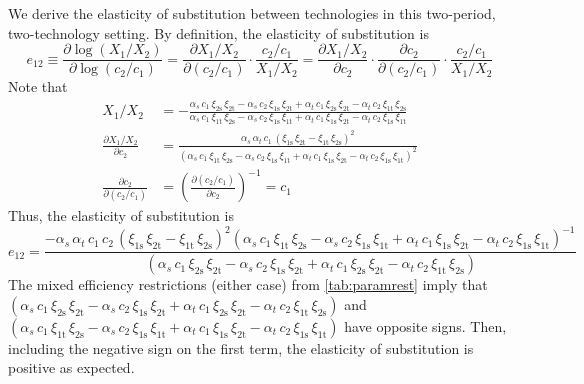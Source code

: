 \documentclass[11pt,a4paper,leqno]{extarticle}
\begin{document}
	We derive the elasticity of substitution between technologies in this two-period, two-technology setting. By definition, the elasticity of substitution is 
	\begin{equation}
	e_{12} \equiv \frac{\partial \log(X_1/X_2)}{\partial \log(c_2/c_1)} = \frac{\partial X_1/X_2 }{ \partial (c_2/c_1)} \cdot \frac{c_2/c_1}{X_1/X_2} = \frac{\partial X_1/X_2}{ \partial  c_2}  \cdot \frac{\partial c_2}{\partial (c_2/c_1)} \cdot \frac{c_2/c_1}{X_1/X_2} 
	\end{equation}
	Note that
	\begin{align}
		X_1/X_2 &= -\frac{\alpha _{s}\,c_{1}\,\xi _{\mathrm{2s}}\,\xi _{\mathrm{2t}}-\alpha _{s}\,c_{2}\,\xi _{\mathrm{1s}}\,\xi _{\mathrm{2t}}+\alpha _{t}\,c_{1}\,\xi _{\mathrm{2s}}\,\xi _{\mathrm{2t}}-\alpha _{t}\,c_{2}\,\xi _{\mathrm{1t}}\,\xi _{\mathrm{2s}}}{\alpha _{s}\,c_{1}\,\xi _{\mathrm{1t}}\,\xi _{\mathrm{2s}}-\alpha _{s}\,c_{2}\,\xi _{\mathrm{1s}}\,\xi _{\mathrm{1t}}+\alpha _{t}\,c_{1}\,\xi _{\mathrm{1s}}\,\xi _{\mathrm{2t}}-\alpha _{t}\,c_{2}\,\xi _{\mathrm{1s}}\,\xi _{\mathrm{1t}}} \\
		\frac{\partial X_1/X_2}{\partial c_2} &= \frac{\alpha _{s}\,\alpha _{t}\,c_{1}\,{\left(\xi _{\mathrm{1s}}\,\xi _{\mathrm{2t}}-\xi _{\mathrm{1t}}\,\xi _{\mathrm{2s}}\right)}^2}{{\left(\alpha _{s}\,c_{1}\,\xi _{\mathrm{1t}}\,\xi _{\mathrm{2s}}-\alpha _{s}\,c_{2}\,\xi _{\mathrm{1s}}\,\xi _{\mathrm{1t}}+\alpha _{t}\,c_{1}\,\xi _{\mathrm{1s}}\,\xi _{\mathrm{2t}}-\alpha _{t}\,c_{2}\,\xi _{\mathrm{1s}}\,\xi _{\mathrm{1t}}\right)}^2}	 \\
		\frac{\partial c_2}{\partial (c_2/c_1)} &= \left( \frac{\partial (c_2/c_1)}{\partial c_2} \right)^{-1} = c_1
	\end{align}
	Thus, the elasticity of substitution is
	\begin{equation}
	e_{12} = 
	\frac{-\alpha _{s}\,\alpha _{t}\,c_{1}\,c_{2}\,{\left(\xi _{\mathrm{1s}}\,\xi _{\mathrm{2t}}-\xi _{\mathrm{1t}}\,\xi _{\mathrm{2s}}\right)}^2 \left(\alpha _{s}\,c_{1}\,\xi _{\mathrm{1t}}\,\xi _{\mathrm{2s}}-\alpha _{s}\,c_{2}\,\xi _{\mathrm{1s}}\,\xi _{\mathrm{1t}}+\alpha _{t}\,c_{1}\,\xi _{\mathrm{1s}}\,\xi _{\mathrm{2t}}-\alpha _{t}\,c_{2}\,\xi _{\mathrm{1s}}\,\xi _{\mathrm{1t}}\right)^{-1}}{
		\,\left(\alpha _{s}\,c_{1}\,\xi _{\mathrm{2s}}\,\xi _{\mathrm{2t}}-\alpha _{s}\,c_{2}\,\xi _{\mathrm{1s}}\,\xi _{\mathrm{2t}}+\alpha _{t}\,c_{1}\,\xi _{\mathrm{2s}}\,\xi _{\mathrm{2t}}-\alpha _{t}\,c_{2}\,\xi _{\mathrm{1t}}\,\xi _{\mathrm{2s}}\right)
	}
	\end{equation}
	The mixed efficiency restrictions (either case) from \autoref{tab:paramrest} imply that $(\alpha _{s}\,c_{1}\,\xi _{\mathrm{2s}}\,\xi _{\mathrm{2t}}-\alpha _{s}\,c_{2}\,\xi _{\mathrm{1s}}\,\xi _{\mathrm{2t}}+\alpha _{t}\,c_{1}\,\xi _{\mathrm{2s}}\,\xi _{\mathrm{2t}}-\alpha _{t}\,c_{2}\,\xi _{\mathrm{1t}}\,\xi _{\mathrm{2s}})$ and $(\alpha _{s}\,c_{1}\,\xi _{\mathrm{1t}}\,\xi _{\mathrm{2s}}-\alpha _{s}\,c_{2}\,\xi _{\mathrm{1s}}\,\xi _{\mathrm{1t}}+\alpha _{t}\,c_{1}\,\xi _{\mathrm{1s}}\,\xi _{\mathrm{2t}}-\alpha _{t}\,c_{2}\,\xi _{\mathrm{1s}}\,\xi _{\mathrm{1t}})$ have opposite signs. Then, including the negative sign on the first term, the elasticity of substitution is positive as expected. 	
	
\end{document}
